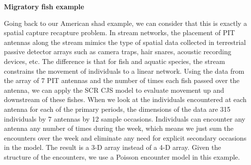 {\bf Migratory fish example}

Going back to our American shad example, we can consider that this is
exactly a spatial capture recapture problem.
In stream networks, the placement of PIT antennas along the stream mimics the
type of spatial data collected in terrestrial passive detector arrays such as
camera traps, hair snares, acoustic recording devices, etc.  The
difference is that for fish and aquatic species, the stream constrains
the movement of individuals to a linear network.  Using the data from the
array of 7 PIT antennas and the number of
times each fish passed over the antenna, we can apply the SCR CJS model to
evaluate movement up and downstream of these fishes.
When we look at the individuals encountered at each antenna for each of the primary periods,
the dimensions of the data are 315
individuals by 7 antennas by 12 sample occasions. Individuals can
encounter any antenna any number of times during the week, which means
we just sum the encounters over the week and eliminate any need for
explicit secondary occasions in the model. The result is a 3-D array
instead of a 4-D array.  Given the structure of the encounters, we use
a Poisson encounter model in this example.

